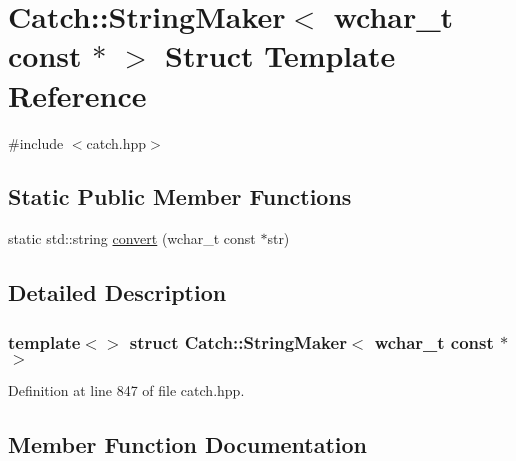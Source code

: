 \hypertarget{struct_catch_1_1_string_maker_3_01wchar__t_01const_01_5_01_4}{}\section{Catch\+:\+:String\+Maker$<$ wchar\+\_\+t const $\ast$ $>$ Struct Template Reference}
\label{struct_catch_1_1_string_maker_3_01wchar__t_01const_01_5_01_4}


{\ttfamily \#include $<$catch.\+hpp$>$}

\subsection*{Static Public Member Functions}
\begin{DoxyCompactItemize}
\item 
static std\+::string \mbox{\hyperlink{struct_catch_1_1_string_maker_3_01wchar__t_01const_01_5_01_4_ae7535a1f417ace45ca05e4389334ffeb}{convert}} (wchar\+\_\+t const $\ast$str)
\end{DoxyCompactItemize}


\subsection{Detailed Description}
\subsubsection*{template$<$$>$\newline
struct Catch\+::\+String\+Maker$<$ wchar\+\_\+t const $\ast$ $>$}



Definition at line 847 of file catch.\+hpp.



\subsection{Member Function Documentation}
\mbox{\label{struct_catch_1_1_string_maker_3_01wchar__t_01const_01_5_01_4_ae7535a1f417ace45ca05e4389334ffeb}} 
